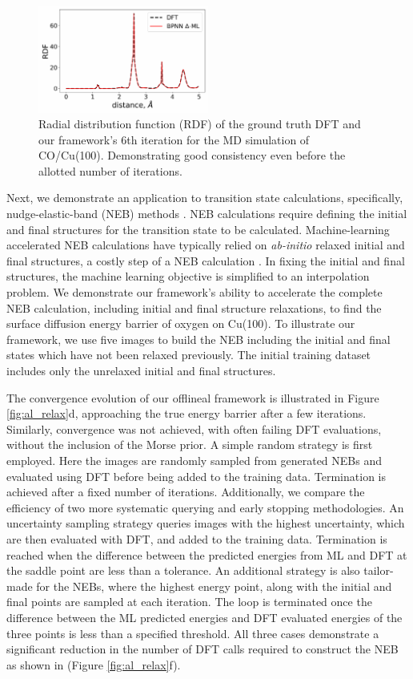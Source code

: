 \documentclass[
 reprint,
 amsmath,
 amssymb,
 aps,
]{revtex4-1}
\begin{document}
\begin{figure}
    \centering
    \includegraphics[width=0.5\textwidth]{figures/figure_5.pdf}
    \caption{Radial distribution function (RDF) of the ground truth DFT and our framework's 6th iteration for the MD simulation of CO/Cu(100). Demonstrating good consistency even before the allotted number of iterations.}
    \label{fig:al_rdf}
\end{figure}

Next, we demonstrate an application to transition state calculations, specifically, nudge-elastic-band (NEB) methods \cite{Henkelman2000, Henkelman2000_2}. NEB calculations require defining the initial and final structures for the transition state to be calculated. Machine-learning accelerated NEB calculations have typically relied on \textit{ab-initio} relaxed initial and final structures, a costly step of a NEB calculation \cite{Ang2020}. In fixing the initial and final structures, the machine learning objective is simplified to an interpolation problem. We demonstrate our framework's ability to accelerate the complete NEB calculation, including initial and final structure relaxations, to find the surface diffusion energy barrier of oxygen on Cu(100). To illustrate our framework, we use five images to build the NEB including the initial and final states which have not been relaxed previously. The initial training dataset includes only the unrelaxed initial and final structures.  

The convergence evolution of our \gls{offlineal} framework is illustrated in Figure \ref{fig:al_relax}d, approaching the true energy barrier after a few iterations. Similarly, convergence was not achieved, with often failing DFT evaluations, without the inclusion of the Morse prior. A simple random strategy is first employed. Here the images are randomly sampled from generated NEBs and evaluated using DFT before being added to the training data. Termination is achieved after a fixed number of iterations. Additionally, we compare the efficiency of two more systematic querying and early stopping methodologies. An uncertainty sampling strategy queries images with the highest uncertainty, which are then evaluated with DFT, and added to the training data. Termination is reached when the difference between the predicted energies from ML and DFT at the saddle point are less than a tolerance. An additional strategy is also tailor-made for the NEBs, where the highest energy point, along with the initial and final points are sampled at each iteration. The loop is terminated once the difference between the ML predicted energies and DFT evaluated energies of the three points is less than a specified threshold. All three cases demonstrate a significant reduction in the number of DFT calls required to construct the NEB as shown in (Figure \ref{fig:al_relax}f).
\end{document}
